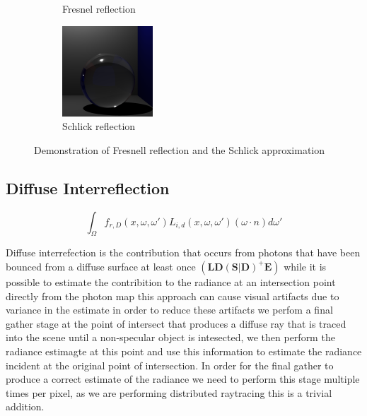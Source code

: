 \begin{figure}[h]
\begin{subfigure}[b]{0.3\textwidth}
	\caption{Fresnel reflection}
\end{subfigure}
\begin{subfigure}[b]{0.3\textwidth}
	\includegraphics[width=\textwidth]{./images/renders/refraction/render-schlick.png}
	\caption{Schlick reflection}
\end{subfigure}
\caption{Demonstration of Fresnell reflection and the Schlick approximation}
\label{fig:shlick-compare}
\end{figure}

\subsection{Diffuse Interreflection}
\begin{equation*}
		\int_{\Omega}
			f_{r,D}(x, \omega, \omega')
			L_{i,d}(x,\omega,\omega')
			(\omega \cdot n)d\omega'
\end{equation*}

Diffuse interrefection is the contribution that occurs from photons that have been bounced from a diffuse surface at least once
$(\mathbf{LD(S|D)^+E})$ while it is possible to estimate the contribition to the radiance at an intersection point directly from the photon map this
approach can cause visual artifacts due to variance in the estimate in order to reduce these artifacts we perfom a final gather
stage at the point of intersect that produces a diffuse ray that is traced into the scene until a non-specular object is intesected,
we then perform the radiance estimagte at this point and use this information to estimate the radiance incident at the original point of
intersection.  In order for the final gather to produce a correct estimate of the radiance we need to perform this stage multiple times per pixel,
as we are performing distributed raytracing this is a trivial addition.

